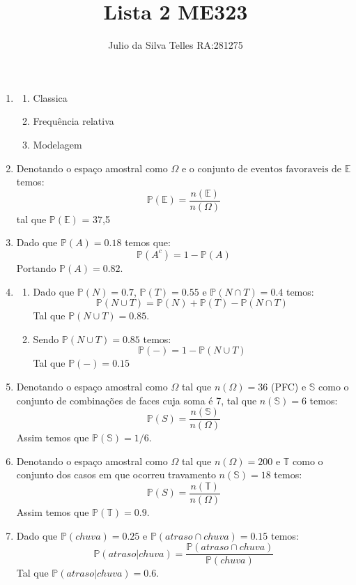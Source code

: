 \documentclass[10pt, a4paper]{article}
\title{\textbf{Lista 2 ME323}}
\author{Julio da Silva Telles RA:281275}
\newcommand{\E}{\mathbb{E}}
\newcommand{\prob}{\mathbb{P}}
\begin{document}
\maketitle{}

\begin{enumerate}
    \item \begin{enumerate}
        \item Classica
        \item Frequência relativa
        \item Modelagem
    \end{enumerate}
    
    \item Denotando o espaço amostral como $\Omega \text{ e o conjunto de eventos favoraveis de } {\E}$ temos:
    $$\prob(\E) = \frac{n(\E)}{n(\Omega)}$$ tal que $\prob(\E)$ = 37,5%
    
    \item Dado que $\prob(A) = 0.18$ temos que: $$\prob(A^{c}) = 1 - \prob(A)$$ Portando $\prob(A) = 0.82$.
    
    \item \begin{enumerate} 
        \item Dado que $\prob(N) = 0.7$, $\prob(T) = 0.55$ e $\prob(N \cap T) = 0.4$ temos:
        $$\prob(N \cup T) = \prob(N) + \prob(T) - \prob(N \cap T)$$
        Tal que $\prob(N \cup T) =  0.85$.
        \item Sendo $\prob(N \cup T) = 0.85$ temos:
        $$\prob(-) = 1 - \prob(N \cup T)$$
        Tal que $\prob(-) = 0.15$
    \end{enumerate}
    
    \item Denotando o espaço amostral como $\Omega$ tal que $n(\Omega) = 36$ (PFC) e $\mathbb{S}$ como o conjunto
    de combinações de faces cuja soma é 7, tal que $n(\mathbb{S}) = 6$ temos:
    $$\prob(S) = \frac{n(\mathbb{S})}{n(\Omega)}$$
    Assim temos que $\prob(\mathbb{S}) = 1/6$.
    
    \item Denotando o espaço amostral como $\Omega$ tal que $n(\Omega) = 200$ e $\mathbb{T}$ como o conjunto
    dos casos em que ocorreu travamento $n(\mathbb{S}) = 18$ temos:
    $$\prob(S) = \frac{n(\mathbb{T})}{n(\Omega)}$$
    Assim temos que $\prob(\mathbb{T}) = 0.9$.
    
    \item Dado que $\prob(chuva) = 0.25$ e $\prob(atraso \cap chuva) = 0.15$ temos:
    $$\prob(atraso|chuva) = \frac{\prob(atraso \cap chuva)}{\prob(chuva)}$$
    Tal que $\prob(atraso|chuva) = 0.6$.
    

\end{enumerate}
\end{document}
